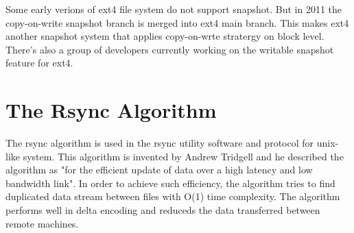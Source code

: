     Some early verions of ext4 file system do not support snapshot. But in 2011 the copy-on-write snapshot branch is merged into ext4 main branch. This makes ext4 another snapshot system that applies copy-on-wrte stratergy on block level. There's also a group of developers currently working on the writable snapshot feature for ext4.

\section{The Rsync Algorithm}
    
    The rsync algorithm is used in the rsync utility software and protocol for unix-like system. This algorithm is invented by Andrew Tridgell and he described the algorithm as "for the efficient update of data over a high latency and low bandwidth link". In order to achieve such efficiency, the algorithm tries to find duplicated data stream between files with O(1) time complexity. The algorithm performs well in delta encoding and reduceds the data transferred between remote machines.
